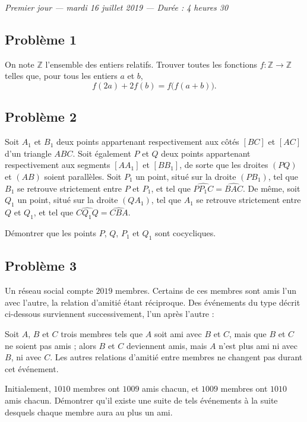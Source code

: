 
\begin{center}
  \emph{Premier jour --- mardi 16 juillet 2019 --- Durée : 4 heures 30}
\end{center}

\subsection*{Problème 1}
On note $\mathbb{Z}$ l'ensemble des entiers relatifs. Trouver toutes les fonctions
$f : \mathbb{Z} \to \mathbb{Z}$ telles que, pour tous les entiers $a$ et $b$,
\[
f(2a) + 2f(b) = f\bigl(f(a+b)\bigr).
\]

\subsection*{Problème 2}
Soit $A_1$ et $B_1$ deux points appartenant respectivement aux côtés $[BC]$ et $[AC]$ d'un triangle $ABC$.
Soit également $P$ et $Q$ deux points appartenant respectivement aux segments $[AA_1]$ et $[BB_1]$, de sorte
que les droites $(PQ)$ et $(AB)$ soient parallèles. Soit $P_1$ un point, situé sur la droite $(PB_1)$, tel que
$B_1$ se retrouve strictement entre $P$ et $P_1$, et tel que $\widehat{PP_1C} = \widehat{BAC}$. De même, soit
$Q_1$ un point, situé sur la droite $(QA_1)$, tel que $A_1$ se retrouve strictement entre $Q$ et $Q_1$, et tel
que $\widehat{CQ_1Q} = \widehat{CBA}$.

Démontrer que les points $P$, $Q$, $P_1$ et $Q_1$ sont cocycliques.

\subsection*{Problème 3}
Un réseau social compte $2019$ membres. Certains de ces membres sont amis l'un avec l'autre, la relation
d'amitié étant réciproque. Des événements du type décrit ci-dessous surviennent successivement, l'un après
l'autre :

Soit $A$, $B$ et $C$ trois membres tels que $A$ soit ami avec $B$ et $C$, mais que $B$ et $C$ ne soient pas
amis ; alors $B$ et $C$ deviennent amis, mais $A$ n'est plus ami ni avec $B$, ni avec $C$. Les autres
relations d'amitié entre membres ne changent pas durant cet événement.

Initialement, $1010$ membres ont $1009$ amis chacun, et $1009$ membres ont $1010$ amis chacun. Démontrer qu'il
existe une suite de tels événements à la suite desquels chaque membre aura au plus un ami.


